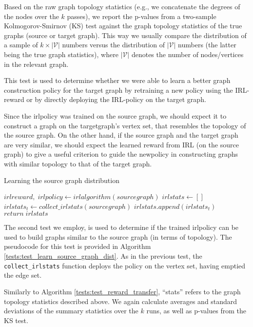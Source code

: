 \documentclass{report}
\numberwithin{equation}{section}
\numberwithin{figure}{section}
\numberwithin{table}{section}
\numberwithin{algorithm}{section}
\begin{document}
Based on the raw graph topology statistics (e.g., we concatenate the 
degrees of the nodes over the $k$ passes), we report the 
p-values from a two-sample Kolmogorov-Smirnov (KS) \citep{KSTest} 
test against the 
graph topology statistics of the true graphs (source or target graph). 
This way we usually compare the distribution of a sample of $k\times |\mathcal{V}|$ 
numbers versus the distribution of $|\mathcal{V}|$ numbers (the latter being the 
true graph statistics), where $|\mathcal{V}|$ denotes the number 
of nodes/vertices in the relevant graph.

This test is used to determine whether we were able to learn a better 
graph construction policy for the target graph 
by retraining a new policy using the IRL-reward 
or by directly deploying the IRL-policy on the target graph.

Since the irlpolicy was trained on the source graph, we should expect 
it to construct a graph on the targetgraph's vertex set, that resembles 
the topology of the source graph. On the other hand, if the source 
graph and the target graph are very similar, we should expect 
the learned reward from IRL (on the source graph) to give a useful 
criterion to guide the 
newpolicy in constructing graphs with similar topology to that 
of the target graph.

\begin{algorithm}
  \caption{Learning the source graph distribution}
  \label{tests:test_learn_source_graph_dist}
  \begin{algorithmic}
    \State $irlreward,\; irlpolicy \gets irlalgorithm(sourcegraph)$
    \State $irlstats \gets []$
    \State $irlstats_t\gets collect\_irlstats(sourcegraph)$
    \State $irlstats.append(irlstats_t)$
    \EndFor
    \State $return\; irlstats$
  \end{algorithmic}
\end{algorithm}
The second test we employ, is used to determine if the trained 
irlpolicy can be used 
to build graphs similar to the source graph (in terms of topology). 
The pseudocode for this test is provided in Algorithm 
\ref{tests:test_learn_source_graph_dist}.
As in the previous test, the \verb|collect_irlstats| 
function deploys 
the policy on the vertex set, having emptied the edge set.

Similarly to Algorithm \ref{tests:test_reward_transfer}, ``stats'' 
refers to the graph topology statistics described above. We again 
calculate averages and standard deviations of the summary statistics 
over the $k$ runs, as well as p-values from the KS test.
\end{document}
